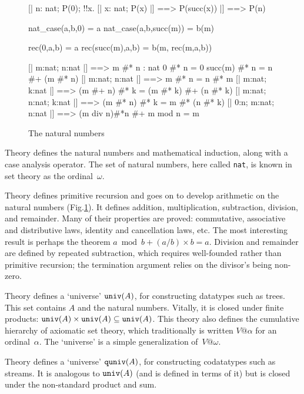 \begin{figure}
\begin{ttbox}
    [| n: nat;  P(0);  !!x. [| x: nat;  P(x) |] ==> P(succ(x)) 
    |] ==> P(n)

    nat_case(a,b,0) = a
 nat_case(a,b,succ(m)) = b(m)

         rec(0,a,b) = a
      rec(succ(m),a,b) = b(m, rec(m,a,b))

     [| m:nat;  n:nat |] ==> m #* n : nat
        0 #* n = 0
     succ(m) #* n = n #+ (m #* n)
  [| m:nat; n:nat |] ==> m #* n = n #* m
 [| m:nat; k:nat |] ==> (m #+ n) #* k = (m #* k) #+ (n #* k)
    [| m:nat;  n:nat;  k:nat |] ==> (m #* n) #* k = m #* (n #* k)
    [| 0:n;  m:nat;  n:nat |] ==> (m div n)#*n #+ m mod n = m
\end{ttbox}
\caption{The natural numbers} \label{zf-nat}
\end{figure}

Theory  defines the natural numbers and mathematical
induction, along with a case analysis operator.  The set of natural
numbers, here called {\tt nat}, is known in set theory as the ordinal~$\omega$.

Theory  defines primitive recursion and goes on to develop
arithmetic on the natural numbers (Fig.\ts\ref{zf-nat}).  It defines
addition, multiplication, subtraction, division, and remainder.  Many of
their properties are proved: commutative, associative and distributive
laws, identity and cancellation laws, etc.  The most interesting result is
perhaps the theorem $a \bmod b + (a/b)\times b = a$.  Division and
remainder are defined by repeated subtraction, which requires well-founded
rather than primitive recursion; the termination argument relies on the
divisor's being non-zero.

Theory  defines a `universe' ${\tt univ}(A)$, for
constructing datatypes such as trees.  This set contains $A$ and the
natural numbers.  Vitally, it is closed under finite products: ${\tt
  univ}(A)\times{\tt univ}(A)\subseteq{\tt univ}(A)$.  This theory also
defines the cumulative hierarchy of axiomatic set theory, which
traditionally is written $V@\alpha$ for an ordinal~$\alpha$.  The
`universe' is a simple generalization of~$V@\omega$.

Theory  defines a `universe' ${\tt quniv}(A)$, for
constructing codatatypes such as streams.  It is analogous to ${\tt
  univ}(A)$ (and is defined in terms of it) but is closed under the
non-standard product and sum.

